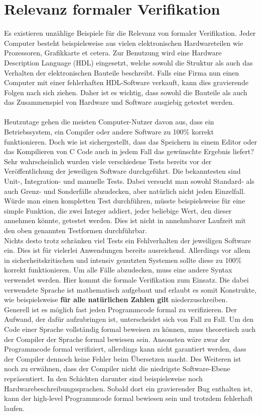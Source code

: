 \section{Relevanz formaler Verifikation}
Es existieren unzählige Beispiele für die Relevanz von formaler Verifikation. Jeder Computer besteht beispielsweise aus vielen elektronischen Hardwareteilen wie Prozessoren, Grafikkarte et cetera. Zur Benutzung wird eine Hardware Description Language (HDL) eingesetzt, welche sowohl die Struktur als auch das Verhalten der elektronischen Bauteile beschreibt. Falls eine Firma nun einen Computer mit einer fehlerhaften HDL-Software verkauft, kann dies gravierende Folgen nach sich ziehen.
Daher ist es wichtig, dass sowohl die Bauteile als auch das Zusammenspiel von Hardware und Software ausgiebig getestet werden.\\
\\
Heutzutage gehen die meisten Computer-Nutzer davon aus, dass ein Betriebssystem, ein Compiler oder andere Software zu 100\% korrekt funktionieren. Doch wie ist sichergestellt, dass das Speichern in einem Editor oder das Kompilieren von C Code auch in jedem Fall das gewünschte Ergebnis liefert? \\
Sehr wahrscheinlich wurden viele verschiedene Tests bereits vor der Veröffentlichung der jeweiligen Software durchgeführt. Die bekanntesten sind Unit-, Integration- und manuelle Tests. Dabei versucht man sowohl Standard- als auch Grenz- und Sonderfälle abzudecken, aber natürlich nicht jeden Einzelfall. Würde man einen kompletten Test durchführen, müsste beispielsweise für eine simple Funktion, die zwei Integer addiert, jeder beliebige Wert, den dieser annehmen könnte, getestet werden. Dies ist nicht in annehmbarer Laufzeit mit den oben genannten Testformen durchführbar.\\
Nichts desto trotz schränken viel Tests ein Fehlverhalten der jeweiligen Software ein. Dies ist für vielerlei Anwendungen bereits ausreichend. Allerdings vor allem in sicherheitskritischen und intensiv genutzten Systemen sollte diese zu 100\% korrekt funktionieren.
Um alle Fälle abzudecken, muss eine andere Syntax verwendet werden. Hier kommt die formale Verifikation zum Einsatz. 
Die dabei verwendete Sprache ist mathematisch aufgebaut und erlaubt es somit Konstrukte, wie beispielsweise \textbf{für alle natürlichen Zahlen gilt} niederzuschreiben.\\
Generell ist es möglich fast jeden Programmcode formal zu verifizieren. Der Aufwand, der dafür aufzubringen ist, unterscheidet sich von Fall zu Fall. Um den Code einer Sprache vollständig formal beweisen zu können, muss theoretisch auch der Compiler der Sprache formal bewiesen sein. Ansonsten wäre zwar der Programmcode formal verifiziert, allerdings kann nicht garantiert werden, dass der Compiler dennoch keine Fehler beim Übersetzen macht. Des Weiteren ist noch zu erwähnen, dass der Compiler nicht die niedrigste Software-Ebene repräsentiert. In den Schichten darunter sind beispielsweise noch Hardwarebeschreibungssprachen. Sobald dort ein gravierender Bug enthalten ist, kann der high-level Programmcode formal bewiesen sein und trotzdem fehlerhaft laufen.
